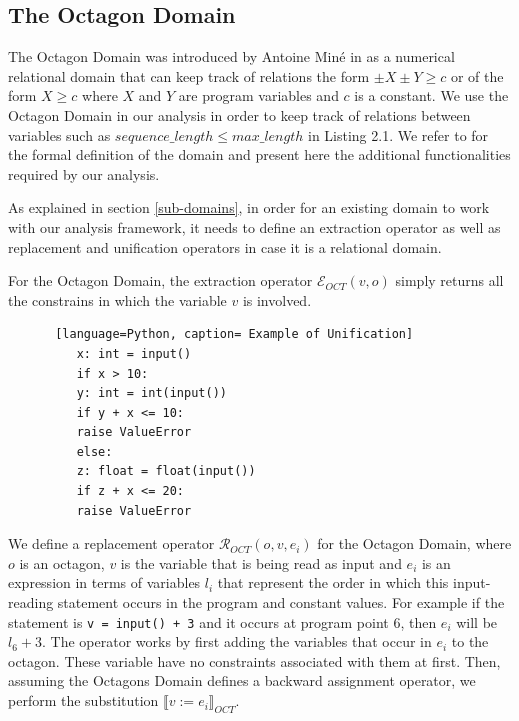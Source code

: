 \documentclass[10pt]{report}
\begin{document}
\subsection{The Octagon Domain} \label{octagon}

The Octagon Domain was introduced by Antoine Min\'{e} in \cite{octagon} as a numerical relational domain that can keep track of relations the form $ \pm X \pm Y \geq c $ or of the form $ X \geq c $ where $ X $ and $ Y $ are program variables and $ c $ is a constant. We use the Octagon Domain in our analysis in order to keep track of relations between variables such as $ sequence\_length \leq max\_length $ in Listing 2.1. We refer to \cite{octagon} for the formal definition of the domain and present here the additional functionalities required by our analysis. 

As explained in section \ref{sub-domains}, in order for an existing domain to work with our analysis framework, it needs to define an extraction operator as well as replacement and unification operators in case it is a relational domain. 

For the Octagon Domain, the extraction operator $ \mathcal{E}_{OCT}(v, o)$ simply returns all the constrains in which the variable $ v $ is involved.

\begin{figure} [t]
\begin{lstlisting} [language=Python, caption= Example of Unification] 
	x: int = input()
	if x > 10:
	y: int = int(input())
	if y + x <= 10:
	raise ValueError
	else:
	z: float = float(input())
	if z + x <= 20:
	raise ValueError
\end{lstlisting}
\end{figure}

We define a replacement operator $ \mathcal{R}_{OCT}(o, v, e_{i}) $ for the Octagon Domain, where $ o $ is an octagon, $ v $ is the variable that is being read as input and $ e_{i} $ is an expression in terms of variables $ l_{i} $ that represent the order in which this input-reading statement occurs in the program and constant values. For example if the statement is \verb|v = input() + 3| and it occurs at program point 6, then $ e_{i} $ will be $ l_{6} + 3 $. The operator works by first adding the variables  that occur in $ e_{i} $ to the octagon. These variable have no constraints associated with them at first. Then, assuming the Octagons Domain defines a backward assignment operator, we perform the substitution $ \llbracket v := e_{i} \rrbracket_{OCT} $.
\end{document}
